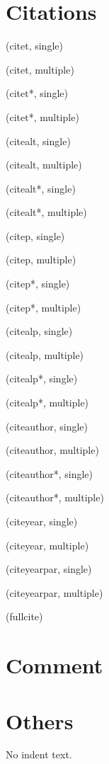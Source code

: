 \documentclass[man]{apa7}
\begin{document}
\section{Citations}

\textcite{Anderson04} (citet, single)

\textcite{Lane12a, Lane12b} (citet, multiple)

\textcite*{Anderson04} (citet*, single)

\textcite*{Lane12a, Lane12b} (citet*, multiple)

\cite{Anderson04} (citealt, single)

\cite{Lane12a, Lane12b} (citealt, multiple)

\cite*{Anderson04} (citealt*, single)

\cite*{Lane12a, Lane12b} (citealt*, multiple)

\parencite{Anderson04} (citep, single)

\parencite{Lane12a, Lane12b} (citep, multiple)

\parencite*{Anderson04} (citep*, single)

\parencite*{Lane12a, Lane12b} (citep*, multiple)

\cite{Anderson04} (citealp, single)

\cite{Lane12a, Lane12b} (citealp, multiple)

\cite*{Anderson04} (citealp*, single)

\cite*{Lane12a, Lane12b} (citealp*, multiple)

\citeauthor{Anderson04} (citeauthor, single)

\citeauthor{Lane12a, Lane12b} (citeauthor, multiple)

\citeauthor*{Anderson04} (citeauthor*, single)

\citeauthor*{Lane12a, Lane12b} (citeauthor*, multiple)

\citeyear{Anderson04} (citeyear, single)

\citeyear{Lane12a, Lane12b} (citeyear, multiple)

\citeyear{Anderson04} (citeyearpar, single)

\citeyear{Lane12a, Lane12b} (citeyearpar, multiple)

 (fullcite)

\section{Comment}


\section{Others}

\noindent{} No indent text.

\printbibliography

\appendix
\end{document}
